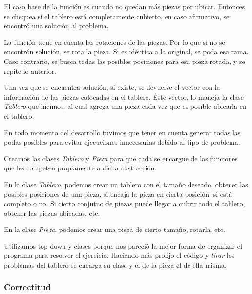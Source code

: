 \quad El caso base de la funci\'on es cuando no quedan m\'as piezas por ubicar. Entonces se chequea si el tablero est\'a completamente cubierto, en caso afirmativo, se encontr\'o una soluci\'on al problema.

\quad La funci\'on tiene en cuenta las rotaciones de las piezas. Por lo que si no se encontr\'on soluci\'on, se rota la pieza. Si es id\'entica a la original, se poda esa rama. Caso contrario, se busca todas las posibles posiciones para esa pieza rotada, y se repite lo anterior.

\quad Una vez que se encuentra soluci\'on, si existe, se devuelve el vector con la informaci\'on de las piezas colocadas en el tablero. \'Este vector, lo maneja la clase \textit{Tablero} que hicimos, al cual agrega una pieza cada vez que es posible ubicarla en el tablero.

\quad En todo momento del desarrollo tuvimos que tener en cuenta generar todas las podas posibles para evitar ejecuciones innecesarias debido al tipo de problema.

\quad Creamos las clases \textit{Tablero} y \textit{Pieza} para que cada se encargue de las funciones que les competen propiamente a dicha abstracci\'on. 

\quad En la clase \textit{Tablero}, podemos crear un tablero con el tama\~no deseado, obtener las posibles posiciones de una pieza, si encaja la pieza en cierta posici\'on, si est\'a completo o no. Si cierto conjutno de piezas puede llegar a cubrir todo el tablero, obtener las piezas ubicadas, etc.

\quad En la clase \textit{Pieza}, podemos crear una pieza de cierto tama\~no, rotarla, etc.

\quad Utilizamos top-down y clases porque nos pareci\'o la mejor forma de organizar el programa para resolver el ejercicio. Haciendo m\'as prolijo el c\'odigo y \textit{tirar} los problemas del tablero se encarga su clase y el de la pieza el de ella misma.



\subsubsection{Correctitud}


